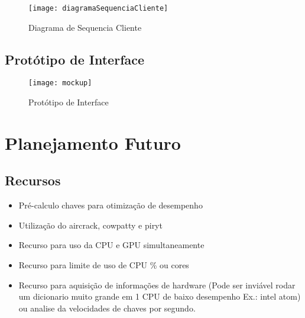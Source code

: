 \documentclass[12pt,a4paper]{abnt}
\begin{document}
			\begin{figure}[htp]
				\begin{center}
				  \texttt{[image: diagramaSequenciaCliente]}
				  \caption{Diagrama de Sequencia Cliente}
				  \label{fig:diagramaSequenciaCliente}
				\end{center}
			\end{figure}
			\FloatBarrier

			
		
		\clearpage
		\section{Protótipo de Interface}
		
			\begin{figure}[htp]
				\begin{center}
				  \texttt{[image: mockup]}
				  \caption{Protótipo de Interface}
				  \label{fig:prototipoInterface}
				\end{center}
			\end{figure}
			\FloatBarrier

\chapter{Planejamento Futuro}
	\section{Recursos}
		\begin{itemize}
			\item Pré-calculo chaves para otimização de desempenho
			\item Utilização do aircrack, cowpatty e piryt
			\item Recurso para uso da CPU e GPU simultaneamente
			\item Recurso para limite de uso de CPU \% ou cores
			\item Recurso para aquisição de informações de hardware (Pode ser inviável rodar um dicionario muito grande em 1 CPU de baixo desempenho Ex.: intel atom) ou analise da velocidades de chaves por segundo.
		\end{itemize}
\end{document}
